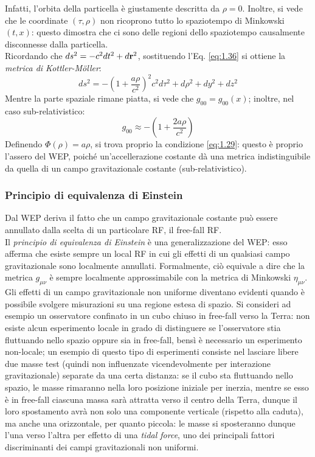 Infatti, l'orbita della particella è giustamente descritta da $ \rho = 0 $. Inoltre, si vede che le coordinate $ (\tau,\rho) $ non ricoprono tutto lo spaziotempo di Minkowski $ (t,x) $: questo dimostra che ci sono delle regioni dello spaziotempo causalmente disconnesse dalla particella.\\
Ricordando che $ ds^2 = -c^2 dt^2 + d\mathbf{r}^2 $, sostituendo l'Eq. \ref{eq:1.36} si ottiene la \textit{metrica di Kottler-Möller}:
\begin{equation}
  ds^2 = - \left( 1 + \frac{a\rho}{c^2} \right)^2 c^2 d\tau^2 + d\rho^2 + dy^2 + dz^2
  \label{eq:1.37}
\end{equation}
Mentre la parte spaziale rimane piatta, si vede che $ g_{00} = g_{00} (x) $; inoltre, nel caso sub-relativistico:
\begin{equation}
  g_{00} \approx - \left( 1 + \frac{2a\rho}{c^2} \right)
  \label{eq:1.38}
\end{equation}
Definendo $ \Phi(\rho) = a\rho $, si trova proprio la condizione \ref{eq:1.29}: questo è proprio l'assero del WEP, poiché un'accellerazione costante dà una metrica indistinguibile da quella di un campo gravitazionale costante (sub-relativistico).

\subsubsection{Principio di equivalenza di Einstein}

Dal WEP deriva il fatto che un campo gravitazionale costante può essere annullato dalla scelta di un particolare RF, il free-fall RF.\\
Il \textit{principio di equivalenza di Einstein} è una generalizzazione del WEP: esso afferma che esiste sempre un local RF in cui gli effetti di un qualsiasi campo gravitazionale sono localmente annullati. Formalmente, ciò equivale a dire che la metrica $ g_{\mu \nu} $ è sempre localmente approssimabile con la metrica di Minkowski $ \eta_{\mu \nu} $.\\
Gli effetti di un campo gravitazionale non uniforme diventano evidenti quando è possibile svolgere misurazioni su una regione estesa di spazio. Si consideri ad esempio un osservatore confinato in un cubo chiuso in free-fall verso la Terra: non esiste alcun esperimento locale in grado di distinguere se l'osservatore stia fluttuando nello spazio oppure sia in free-fall, bensì è necessario un esperimento non-locale; un esempio di questo tipo di esperimenti consiste nel lasciare libere due masse test (quindi non influenzate vicendevolmente per interazione gravitazionale) separate da una certa distanza: se il cubo sta fluttuando nello spazio, le masse rimaranno nella loro posizione iniziale per inerzia, mentre se esso è in free-fall ciascuna massa sarà attratta verso il centro della Terra, dunque il loro spostamento avrà non solo una componente verticale (rispetto alla caduta), ma anche una orizzontale, per quanto piccola: le masse si sposteranno dunque l'una verso l'altra per effetto di una \textit{tidal force}, uno dei principali fattori discriminanti dei campi gravitazionali non uniformi.

